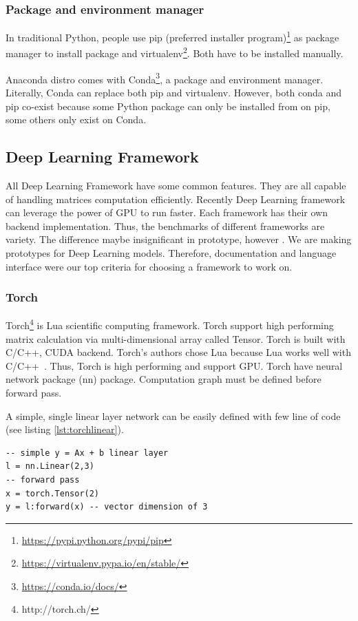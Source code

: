 \subsubsection{Package and environment manager}  
In traditional Python, people use pip (preferred installer program)\footnote{\url{https://pypi.python.org/pypi/pip}} as package manager to install package and virtualenv\footnote{\url{https://virtualenv.pypa.io/en/stable/}}. Both have to be installed manually.

Anaconda distro comes with Conda\footnote{\url{https://conda.io/docs/}}, a package and environment manager. 
Literally, Conda can replace both pip and virtualenv. 
However, both conda and pip co-exist because some Python package can only be installed from on pip, some others only exist on Conda.


\subsection{Deep Learning Framework}
All Deep Learning Framework have some common features. 
They are all capable of handling matrices computation efficiently. 
Recently Deep Learning framework can leverage the power of GPU to run faster. 
Each framework has their own backend implementation. 
Thus, the benchmarks of different frameworks are variety. 
The difference maybe insignificant in prototype, however .
We are making prototypes for Deep Learning models. 
Therefore, documentation and language interface were our top criteria for choosing a framework to work on. 

\subsubsection{Torch}\label{sec:torch}
Torch\footnote{http://torch.ch/} is Lua scientific computing framework. 
Torch support high performing matrix calculation via multi-dimensional array called Tensor. Torch is built with C/C++, CUDA backend. 
Torch's authors chose Lua because Lua works well with C/C++~\cite{collobert2011torch7}.  Thus, Torch is high performing and support GPU. Torch have neural network package (nn) package. Computation graph must be defined before forward pass.

A simple, single linear layer network can be easily defined with few line of code (see listing \ref{lst:torchlinear}).

\begin{lstlisting}[caption={Simple linear layer in Torch},label={lst:torchlinear}, language={[5.1]Lua}]
-- simple y = Ax + b linear layer
l = nn.Linear(2,3)
-- forward pass
x = torch.Tensor(2)
y = l:forward(x) -- vector dimension of 3
\end{lstlisting}

